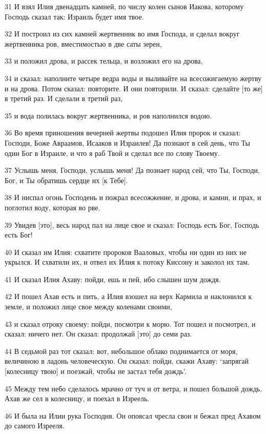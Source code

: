 \par 31 И взял Илия двенадцать камней, по числу колен сынов Иакова, которому Господь сказал так: Израиль будет имя твое.
\par 32 И построил из сих камней жертвенник во имя Господа, и сделал вокруг жертвенника ров, вместимостью в две саты зерен,
\par 33 и положил дрова, и рассек тельца, и возложил его на дрова,
\par 34 и сказал: наполните четыре ведра воды и выливайте на всесожигаемую жертву и на дрова. Потом сказал: повторите. И они повторили. И сказал: сделайте [то же] в третий раз. И сделали в третий раз,
\par 35 и вода полилась вокруг жертвенника, и ров наполнился водою.
\par 36 Во время приношения вечерней жертвы подошел Илия пророк и сказал: Господи, Боже Авраамов, Исааков и Израилев! Да познают в сей день, что Ты один Бог в Израиле, и что я раб Твой и сделал все по слову Твоему.
\par 37 Услышь меня, Господи, услышь меня! Да познает народ сей, что Ты, Господи, Бог, и Ты обратишь сердце их [к Тебе].
\par 38 И ниспал огонь Господень и пожрал всесожжение, и дрова, и камни, и прах, и поглотил воду, которая во рве.
\par 39 Увидев [это], весь народ пал на лице свое и сказал: Господь есть Бог, Господь есть Бог!
\par 40 И сказал им Илия: схватите пророков Вааловых, чтобы ни один из них не укрылся. И схватили их, и отвел их Илия к потоку Киссону и заколол их там.
\par 41 И сказал Илия Ахаву: пойди, ешь и пей, ибо слышен шум дождя.
\par 42 И пошел Ахав есть и пить, а Илия взошел на верх Кармила и наклонился к земле, и положил лице свое между коленами своими,
\par 43 и сказал отроку своему: пойди, посмотри к морю. Тот пошел и посмотрел, и сказал: ничего нет. Он сказал: продолжай [это] до семи раз.
\par 44 В седьмой раз тот сказал: вот, небольшое облако поднимается от моря, величиною в ладонь человеческую. Он сказал: пойди, скажи Ахаву: `запрягай [колесницу твою] и поезжай, чтобы не застал тебя дождь'.
\par 45 Между тем небо сделалось мрачно от туч и от ветра, и пошел большой дождь. Ахав же сел в колесницу, и поехал в Изреель.
\par 46 И была на Илии рука Господня. Он опоясал чресла свои и бежал пред Ахавом до самого Изрееля.


